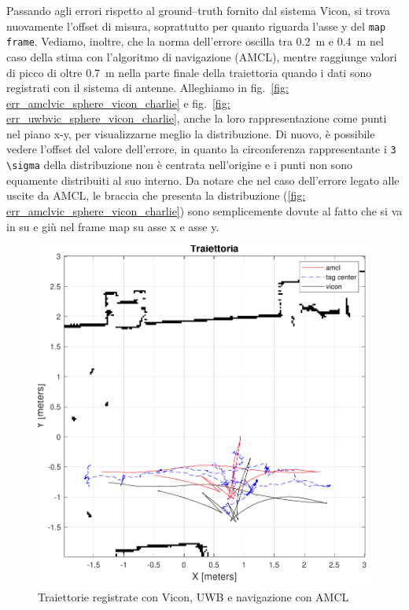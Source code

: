 \vspace{0.5cm}
Passando agli errori rispetto al ground--truth fornito dal sistema Vicon, si trova nuovamente l'offset di misura, soprattutto per quanto riguarda l'asse y del \verb|map frame|. Vediamo, inoltre, che la norma dell'errore oscilla tra \SI{0.2}{\metre} e \SI{0.4}{\metre} nel caso della stima con l'algoritmo di navigazione (AMCL), mentre raggiunge valori di picco di oltre \SI{0.7}{\metre } nella parte finale della traiettoria quando i dati sono registrati con il sistema di antenne.
Alleghiamo in fig.~\ref{fig: err_amclvic_sphere_vicon_charlie} e fig.~\ref{fig: err_uwbvic_sphere_vicon_charlie}, anche la loro rappresentazione come punti nel piano x-y, per visualizzarne meglio la distribuzione. Di nuovo, è possibile vedere l'offset del valore dell'errore, in quanto la circonferenza rappresentante i \verb|3 \sigma| della distribuzione non è centrata nell'origine e i punti non sono equamente distribuiti al suo interno. Da notare che nel caso dell'errore legato alle uscite da AMCL, le braccia che presenta la distribuzione (\ref{fig: err_amclvic_sphere_vicon_charlie}) sono semplicemente dovute al fatto che si va in su e giù nel frame map su asse x e asse y.

\begin{figure}[] 
	\centering    
	\includegraphics[height=.4\textheight]{grafici_stanzavolo_vicon/figure1.pdf}
	\caption{Traiettorie registrate con Vicon, UWB e navigazione con AMCL}
	\label{fig: traiettorie_vicon_charlie}
\end{figure}


